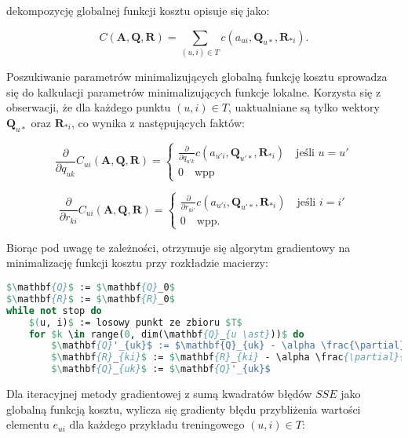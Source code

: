 \documentclass{pracamgr}
\begin{document}
dekompozycję globalnej funkcji kosztu opisuje się jako:

\[
C(\mathbf{A}, \mathbf{Q}, \mathbf{R}) = \sum_{(u,i) \in T} c(a_{ui}, \mathbf{Q}_{u \ast}, \mathbf{R}_{\ast i}).
\]

Poszukiwanie parametrów minimalizujących globalną funkcję kosztu sprowadza się do kalkulacji parametrów minimalizujących funkcje lokalne. Korzysta się z obserwacji, że dla każdego punktu $(u, i) \in T$, uaktualniane są tylko wektory $\mathbf{Q}_{u \ast}$ oraz $\mathbf{R}_{\ast i}$, co wynika z następujących faktów:

\[
\frac{\partial}{\partial q_{uk}} C_{ui}(\mathbf{A}, \mathbf{Q}, \mathbf{R}) = \begin{cases}
    \frac{\partial}{\partial q_{u'k}} c(a_{u'i}, \mathbf{Q}_{u' \ast}, \mathbf{R}_{\ast i}) \quad \text{jeśli $u = u'$} \\
    0 \quad \text{wpp}
\end{cases}
\]

\[
\frac{\partial}{\partial r_{ki}} C_{ui}(\mathbf{A}, \mathbf{Q}, \mathbf{R}) = \begin{cases}
    \frac{\partial}{\partial r_{ki'}} c(a_{u'i}, \mathbf{Q}_{u' \ast}, \mathbf{R}_{\ast i}) \quad \text{jeśli $i = i'$} \\
    0 \quad \text{wpp}.
\end{cases}
\]

Biorąc pod uwagę te zależności, otrzymuje się algorytm gradientowy na minimalizację funkcji kosztu przy rozkładzie macierzy:

\begin{lstlisting}[language=Pascal, mathescape=true,frame=single,caption={Metoda gradientowa rozkładu macierzy},captionpos=b]
$\mathbf{Q}$ := $\mathbf{Q}_0$
$\mathbf{R}$ := $\mathbf{R}_0$
while not stop do
    $(u, i)$ := losowy punkt ze zbioru $T$
    for $k \in range(0, dim(\mathbf{Q}_{u \ast}))$ do
        $\mathbf{Q}'_{uk}$ := $\mathbf{Q}_{uk} - \alpha \frac{\partial}{\partial \mathbf{Q}_{uk}} c(a_{ui}, \mathbf{Q}_{u \ast}, \mathbf{R}_{\ast i})$
        $\mathbf{R}_{ki}$ := $\mathbf{R}_{ki} - \alpha \frac{\partial}{\partial \mathbf{R}_{ki}} c(a_{ui}, \mathbf{Q}_{u \ast}, \mathbf{R}_{\ast i})$
        $\mathbf{Q}_{uk}$ := $\mathbf{Q}'_{uk}$

\end{lstlisting}

Dla iteracyjnej metody gradientowej z sumą kwadratów błędów $SSE$ jako globalną funkcją kosztu, wylicza się gradienty błędu przybliżenia wartości elementu $e_{ui}$ dla każdego przykładu treningowego $(u,i) \in T$:
\end{document}
